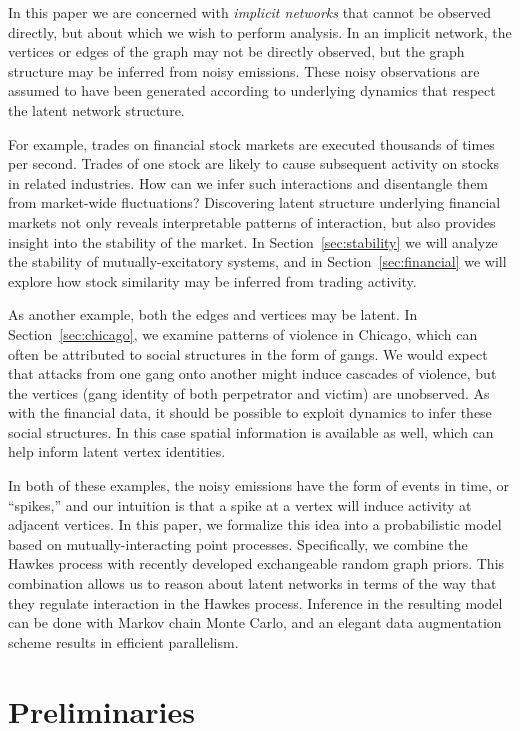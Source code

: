 In this paper we are concerned with \emph{implicit networks} that cannot be observed directly, but about which we wish to perform analysis.  In an implicit network, the vertices or edges of the graph may not be directly observed, but the graph structure may be inferred from noisy emissions.  These noisy observations are assumed to have been generated according to underlying dynamics that respect the latent network structure.

For example, trades on financial stock markets are executed thousands of times per second. Trades of one stock are likely to cause subsequent activity on stocks in related industries. How can we infer such interactions and disentangle them from market-wide fluctuations? Discovering latent structure underlying financial markets not only reveals interpretable patterns of interaction, but also provides insight into the stability of the market. In Section~\ref{sec:stability} we will analyze the stability of mutually-excitatory systems, and in Section~\ref{sec:financial} we will explore how stock similarity may be inferred from trading activity.

As another example, both the edges and vertices may be latent.  In Section~\ref{sec:chicago}, we examine patterns of violence in Chicago, which can often be attributed to social structures in the form of gangs.  We would expect that attacks from one gang onto another might induce cascades of violence, but the vertices (gang identity of both perpetrator and victim) are unobserved.  As with the financial data, it should be possible to exploit dynamics to infer these social structures.  In this case spatial information is available as well, which can help inform latent vertex identities.

In both of these examples, the noisy emissions have the form of events in time, or ``spikes,'' and our intuition is that a spike at a vertex will induce activity at adjacent vertices.  In this paper, we formalize this idea into a probabilistic model based on mutually-interacting point processes.  Specifically, we combine the Hawkes process \cite{Hawkes-1971} with recently developed exchangeable random graph priors.  This combination allows us to reason about latent networks in terms of the way that they regulate interaction in the Hawkes process.  Inference in the resulting model can be done with Markov chain Monte Carlo, and an elegant data augmentation scheme results in efficient parallelism. 


\section{Preliminaries}
